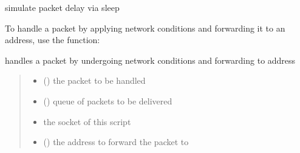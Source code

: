 \documentclass[letterpaper,10pt,english,openany,oneside]{sphinxmanual}
\begin{document}
\begin{fulllineitems}
\label{\detokenize{index:intermediary.simulate_delay}}
\pysigstartsignatures
\pysiglinewithargsret
{}
{}
{}
\pysigstopsignatures
\sphinxAtStartPar
simulate packet delay via sleep

\end{fulllineitems}


\sphinxAtStartPar
To handle a packet by applying network conditions and forwarding it to an address, use the  function:

\begin{fulllineitems}
\label{\detokenize{index:intermediary.handle_packet}}
\pysigstartsignatures
\pysiglinewithargsret
{}
{\sphinxparamcomma {}\sphinxparamcomma {}\sphinxparamcomma {}}
{}
\pysigstopsignatures
\sphinxAtStartPar
handles a packet by undergoing network conditions and forwarding to address
\begin{quote}\begin{description}
\begin{itemize}
\item {} 
\sphinxAtStartPar
{} () \textendash{} the packet to be handled

\item {} 
\sphinxAtStartPar
{} () \textendash{} queue of packets to be delivered

\item {} 
\sphinxAtStartPar
{} \textendash{} the socket of this script

\item {} 
\sphinxAtStartPar
{} () \textendash{} the address to forward the packet to

\end{itemize}

\end{description}\end{quote}

\end{fulllineitems}
\end{document}

